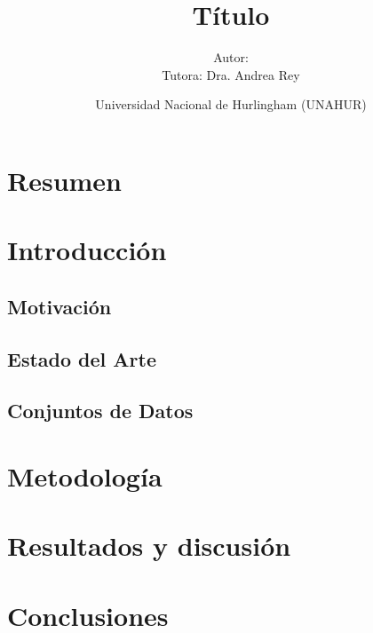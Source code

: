 \documentclass[a4paper,10pt]{book}
\title{Título}
\author{Autor:  \\ Tutora: Dra. Andrea Rey}
\date{Universidad Nacional de Hurlingham (UNAHUR)}
\renewcommand{\listfigurename}{\'Indice de Figuras}
\renewcommand{\listtablename}{\'Indice de Tablas}
\begin{document}
\maketitle


	\tableofcontents
	
	\renewcommand{\listfigurename}{Índice de Figuras}
	\listoffigures
	
    \renewcommand{\listtablename}{Índice de Tablas}
	\listoftables



\chapter*{Resumen}

\noindent



\chapter{Introducción}



\section{Motivación}

\section{Estado del Arte}
 
\section{Conjuntos de Datos}


\chapter{Metodología}
\label{Sec:Métodos}


\chapter{Resultados y discusión}
\label{ch:resultados}


\chapter{Conclusiones}



\end{document}
